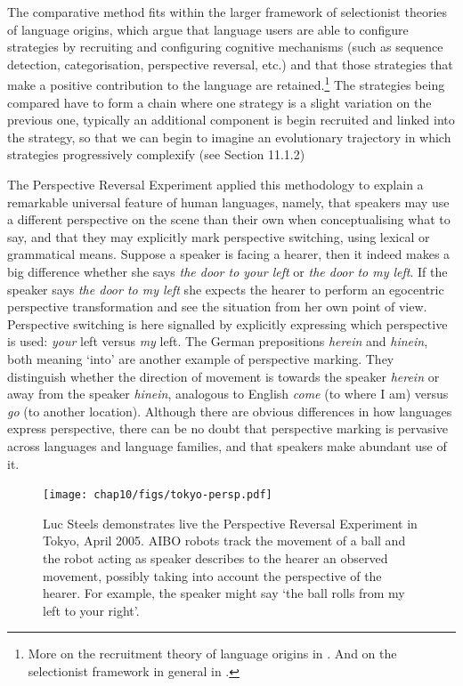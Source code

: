 The comparative method fits within the larger framework of selectionist theories  
of language origins, which argue that language users are able to configure strategies by recruiting and configuring 
cognitive mechanisms (such as sequence detection, categorisation, perspective reversal, etc.) and that those 
strategies that make a positive contribution to the language are retained.\footnote{
More on the recruitment theory of language origins in \cite{Steels:2007recruitment}. 
And on the selectionist framework in general in \cite{Steels:2012}.}
The strategies being compared have to form a chain where one strategy is a slight variation on the previous one, typically 
an additional component is begin recruited and linked into the strategy, so that we can begin to imagine an 
evolutionary trajectory in which strategies progressively complexify (see Section 11.1.2)

The Perspective Reversal Experiment applied this methodology to explain a remarkable universal feature 
of human languages, namely, 
that speakers may use a different perspective on the scene than their own when 
conceptualising what to say, and that they may explicitly mark perspective switching, using lexical or grammatical means. Suppose
a speaker is facing a hearer, then it indeed makes a big difference whether she says 
\emph{the door to your left}  or \emph{the door to my left}. If the speaker says
\emph{the door to my left} she expects the hearer to perform an egocentric
perspective transformation and see the situation from her own point of view. Perspective switching is here signalled by 
explicitly expressing which perspective is used: {\itshape your} left versus {\itshape my} left. 
The German prepositions \emph{herein} and \emph{hinein}, both meaning `into' are another example of perspective marking. They
distinguish whether the direction of movement is 
towards the speaker \emph{herein} or away from the speaker \emph{hinein}, analogous to English \emph{come} (to where I am) 
versus \emph{go} (to another location). Although there are obvious differences in how languages express
perspective, there can be no doubt that perspective marking is pervasive across 
languages and language families, and that speakers make abundant use of it. 

\begin{figure}[htbp]
  \centerline{\texttt{[image: chap10/figs/tokyo-persp.pdf]}}
\caption{\label{fig:tokyo-persp} 
Luc Steels demonstrates live the Perspective Reversal Experiment in Tokyo, April 2005. AIBO robots track 
the movement of a ball and 
the robot acting as speaker describes to the hearer an observed movement, possibly taking into account the 
perspective of the hearer. For example, the speaker might say `the ball rolls from my left to your right'.}
\end{figure}

